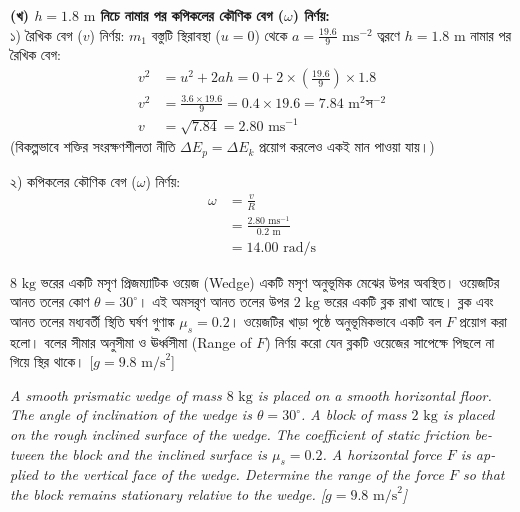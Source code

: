 \documentclass[12pt, a4paper]{article}
\begin{document}
\begin{tcolorbox}[solutionbox={সমাধান (Solution)}]
\vspace{0.5em}
\noindent\textbf{(খ) $h = 1.8\text{ m}$ নিচে নামার পর কপিকলের কৌণিক বেগ ($\omega$) নির্ণয়:} \\
১) রৈখিক বেগ ($v$) নির্ণয়: $m_1$ বস্তুটি স্থিরাবস্থা ($u = 0$) থেকে $a = \frac{19.6}{9}\text{ ms}^{-2}$ ত্বরণে $h = 1.8\text{ m}$ নামার পর রৈখিক বেগ:
\begin{align*}
    v^2 &= u^2 + 2 a h = 0 + 2 \times \left(\frac{19.6}{9}\right) \times 1.8 \\
    v^2 &= \frac{3.6 \times 19.6}{9} = 0.4 \times 19.6 = 7.84\text{ m}^2\text{স}^{-2} \\
    v &= \sqrt{7.84} = 2.80\text{ ms}^{-1}
\end{align*}
(বিকল্পভাবে শক্তির সংরক্ষণশীলতা নীতি $\Delta E_p = \Delta E_k$ প্রয়োগ করলেও একই মান পাওয়া যায়।)

২) কপিকলের কৌণিক বেগ ($\omega$) নির্ণয়:
\begin{align*}
    \omega &= \frac{v}{R} \\
           &= \frac{2.80\text{ ms}^{-1}}{0.2\text{ m}} \\
           &= \mathbf{14.00}\text{ rad/s}
\end{align*}
\end{tcolorbox}
\begin{tcolorbox}[questionbox={প্রশ্ন (Question) 2}]
\noindent
$8\text{ kg}$ ভরের একটি মসৃণ প্রিজম্যাটিক ওয়েজ (Wedge) একটি মসৃণ অনুভূমিক মেঝের উপর অবস্থিত। ওয়েজটির আনত তলের কোণ $\theta = 30^\circ$। এই অমসরৃণ আনত তলের উপর $2\text{ kg}$ ভরের একটি ব্লক রাখা আছে। ব্লক এবং আনত তলের মধ্যবর্তী স্থিতি ঘর্ষণ গুণাঙ্ক $\mu_s = 0.2$। ওয়েজটির খাড়া পৃষ্ঠে অনুভূমিকভাবে একটি বল $F$ প্রয়োগ করা হলো। বলের সীমার অনুসীমা ও ঊর্ধ্বসীমা (Range of $F$) নির্ণয় করো যেন ব্লকটি ওয়েজের সাপেক্ষে পিছলে না গিয়ে স্থির থাকে। [$g = 9.8\text{ m/s}^2$]

\vspace{0.8em}
\begin{english}
\noindent\textit{\color{darkgray}
A smooth prismatic wedge of mass $8\text{ kg}$ is placed on a smooth horizontal floor. The angle of inclination of the wedge is $\theta = 30^\circ$. A block of mass $2\text{ kg}$ is placed on the rough inclined surface of the wedge. The coefficient of static friction between the block and the inclined surface is $\mu_s = 0.2$. A horizontal force $F$ is applied to the vertical face of the wedge. Determine the range of the force $F$ so that the block remains stationary relative to the wedge. [$g = 9.8\text{ m/s}^2$]
}
\end{english}
\end{tcolorbox}
\end{document}
